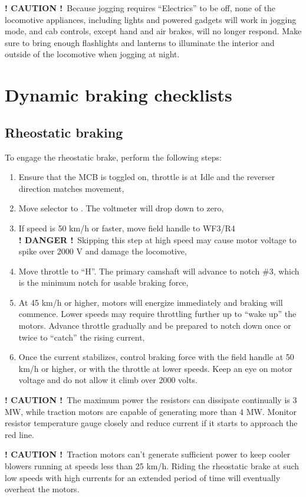 \documentclass[11pt, a4paper]{article}
\newcommand{\brakemode}[1]{%
    \begingroup
    \setlength{\fboxsep}{0pt}%
    \raisebox{0.1em}{%
        \colorbox{red}{%
            \parbox[c][1.4em][c]{1.4em}{%
                \centering
                \color{black}\bfseries #1%
            }%
        }%
    }%
    \endgroup
}
\newcommand{\danger}{\textbf{\color{red} ! DANGER !}}
\newcommand{\caution}{\textbf{\color{orange} ! CAUTION !}}
\begin{document}
\caution\ Because jogging requires ``Electrics'' to be off, none of the locomotive appliances, including lights and powered gadgets will work in jogging mode, and cab controls, except hand and air brakes, will no longer respond. Make sure to bring enough flashlights and lanterns to illuminate the interior and outside of the locomotive when jogging at night.
\newpage

\section{Dynamic braking checklists}

\subsection{Rheostatic braking}
To engage the rheostatic brake, perform the following steps:
\begin{enumerate}
\item Ensure that the MCB is toggled on, throttle is at Idle and the reverser direction matches movement,
\item Move selector to \brakemode{R}. The voltmeter will drop down to zero,
\item If speed is 50 km/h or faster, move field handle to WF3/R4\\
\danger\ Skipping this step at high speed may cause motor voltage to spike over 2000 V and damage the locomotive,
\item Move throttle to ``H''. The primary camshaft will advance to notch \#3, which is the minimum notch for usable braking force,
\item At 45 km/h or higher, motors will energize immediately and braking will commence. Lower speeds may require throttling further up to ``wake up'' the motors. Advance throttle gradually and be prepared to notch down once or twice to ``catch'' the rising current,
\item Once the current stabilizes, control braking force with the field handle at 50 km/h or higher, or with the throttle at lower speeds. Keep an eye on motor voltage and do not allow it climb over 2000 volts.
\end{enumerate}

\caution\ The maximum power the resistors can dissipate continually is 3 MW, while traction motors are capable of generating more than 4 MW. Monitor resistor temperature gauge closely and reduce current if it starts to approach the red line.

\caution\ Traction motors can't generate sufficient power to keep cooler blowers running at speeds less than 25 km/h. Riding the rheostatic brake at such low speeds with high currents for an extended period of time will eventually overheat the motors.
\end{document}
